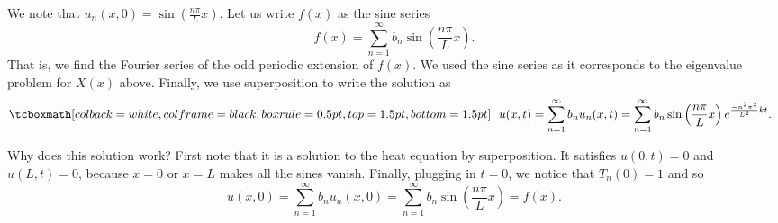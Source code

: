 We note that $u_n(x,0) = \sin \left( \frac{n \pi}{L} x \right)$.  Let us
write $f(x)$ as the sine series
\begin{equation*}
f(x) = \sum_{n=1}^\infty b_n \sin \left(\frac{n \pi}{L}  x \right) .
\end{equation*}
That is, we find the Fourier series of the odd periodic extension of $f(x)$.
We used the sine series as it corresponds to the eigenvalue problem for
$X(x)$ above.
Finally, we use superposition to write the solution as
\begin{equation*}
\mybxbg{~~
u(x,t) = 
\sum_{n=1}^\infty
b_n
u_n(x,t)
=
\sum_{n=1}^\infty
b_n
\sin \left( \frac{n \pi}{L}  x \right)
e^{\frac{-n^2 \pi^2}{L^2} k t} .
~~}
\end{equation*}

Why does this solution work?  First note that it is a solution to
the heat equation by superposition.  It satisfies $u(0,t) = 0$
and $u(L,t) = 0$, because $x=0$ or $x=L$ makes all the sines vanish.
Finally, plugging in $t=0$, we notice that $T_n(0) = 1$ and so
\begin{equation*}
u(x,0) = 
\sum_{n=1}^\infty
b_n
u_n(x,0)
=
\sum_{n=1}^\infty
b_n
\sin \left( \frac{n \pi}{L} x \right)
=
f(x) .
\end{equation*}

